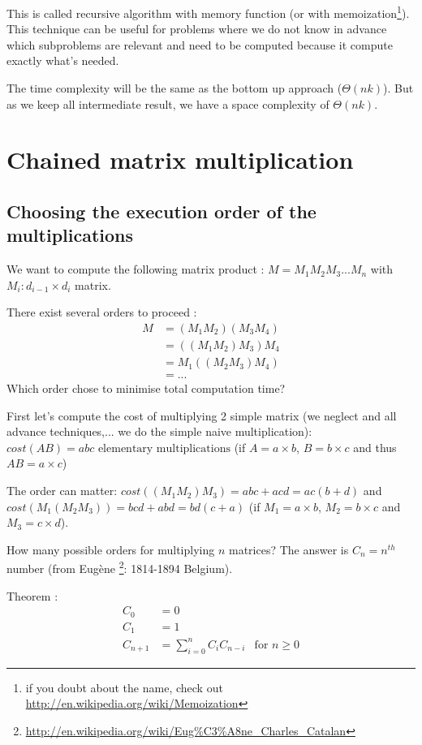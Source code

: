 This is called recursive algorithm with memory function (or with memoization\footnote{if you doubt about the name, check out \url{http://en.wikipedia.org/wiki/Memoization}}). This technique can be useful for problems where we do not know in advance which subproblems are relevant and need to be computed because it compute exactly what's needed.

The time complexity will be the same as the bottom up approach ($\Theta (nk)$). But as we keep all intermediate result, we have a space complexity of $\Theta (nk)$. 

\section{Chained matrix multiplication}

\subsection{Choosing the execution order of the multiplications}

We want to compute the following matrix product : $ M = M_1M_2M_3...M_n$ with $M_i:d_{i-1}\times d_{i}$ matrix.

There exist several orders to proceed :
\begin{align*}
M&=(M_1M_2)(M_3M_4)\\
 &= ((M_1M_2)M_3)M_4\\ 
 &= M_1((M_2M_3)M_4)\\
 &=...
\end{align*}
Which order chose to minimise total computation time?

First let's compute the cost of multiplying 2 simple matrix (we neglect  and all advance techniques,... we do the simple naive multiplication):\\
$cost(AB) = abc\text{ elementary multiplications}$ (if $A=a\times b$, $B=b\times c$ and thus $AB = a\times c$)

The order can matter: $cost((M_1M_2)M_3) = abc+acd = ac(b+d)$ and $cost(M_1(M_2M_3)) = bcd + abd=bd(c+a)$ (if $M_1=a\times b$, $M_2=b\times c$ and $M_3 = c\times d$).

How many possible orders for multiplying $n$ matrices?
The answer is $C_n = n^{th}$ number
(from Eugène \footnote{\url{http://en.wikipedia.org/wiki/Eug\%C3\%A8ne_Charles_Catalan}}: 1814-1894 Belgium).

\begin{theorem}\label{cm4:valC}
Theorem :
\begin{align*}
C_0 &=0\\
C_1 &=1\\
C_{n+1} &= \sum_{i=0}^{n}C_iC_{n-i} &\text{for }n\geq 0
\end{align*}
\end{theorem}

